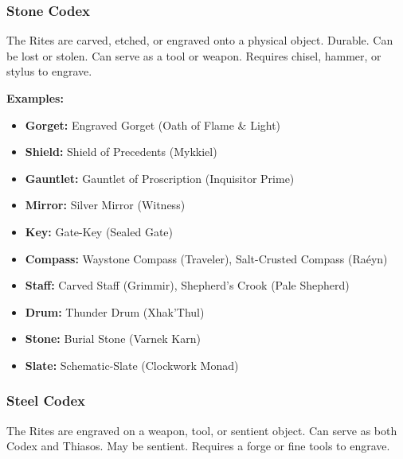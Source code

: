 \subsubsection*{Stone Codex}
The Rites are carved, etched, or engraved onto a physical object. Durable. Can be lost or stolen. Can serve as a tool or weapon. Requires chisel, hammer, or stylus to engrave.

\textbf{Examples:}
\begin{itemize}
\item \textbf{Gorget:} Engraved Gorget (Oath of Flame \& Light)
\item \textbf{Shield:} Shield of Precedents (Mykkiel)
\item \textbf{Gauntlet:} Gauntlet of Proscription (Inquisitor Prime)
\item \textbf{Mirror:} Silver Mirror (Witness)
\item \textbf{Key:} Gate-Key (Sealed Gate)
\item \textbf{Compass:} Waystone Compass (Traveler), Salt-Crusted Compass (Raéyn)
\item \textbf{Staff:} Carved Staff (Grimmir), Shepherd's Crook (Pale Shepherd)
\item \textbf{Drum:} Thunder Drum (Xhak'Thul)
\item \textbf{Stone:} Burial Stone (Varnek Karn)
\item \textbf{Slate:} Schematic-Slate (Clockwork Monad)
\end{itemize}

\subsubsection*{Steel Codex}
The Rites are engraved on a weapon, tool, or sentient object. Can serve as both Codex and Thiasos. May be sentient. Requires a forge or fine tools to engrave.

